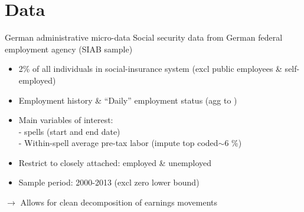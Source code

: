 \documentclass[10pt, aspectratio = 169]{beamer} %
\theoremstyle{mystyle}
\begin{document}
\section{Data}
\begin{frame}{German administrative micro-data}
Social security data from German federal employment agency (SIAB sample)
\begin{itemize}
    \item 2\% of all individuals in social-insurance system (excl public employees \& self-employed)
    \item Employment history \& ``Daily'' employment status (agg to )
    \item Main variables of interest:\\
    \vspace{2pt}
    -  spells (start and end date)\\
    \vspace{2pt}
    - Within-spell average pre-tax labor  (impute top coded$\sim 6$ \%)
    \item Restrict to closely attached: employed \& unemployed 
    \item Sample period: 2000-2013 (excl zero lower bound)
\end{itemize}
\alert{$\to$ Allows for clean decomposition of earnings movements}
\end{frame}
\end{document}
